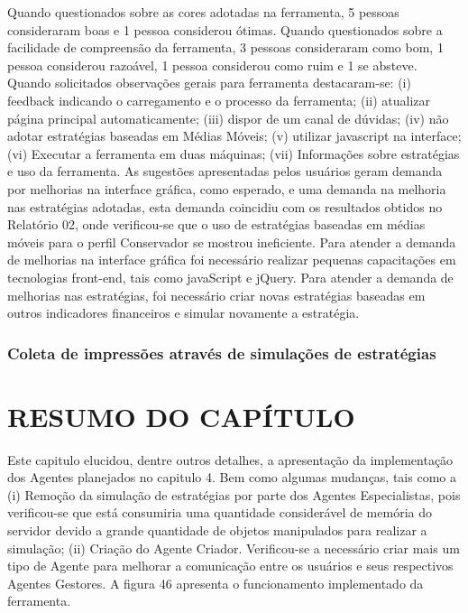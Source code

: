 
Quando questionados sobre as cores adotadas na ferramenta, 5 pessoas consideraram boas e 1 pessoa considerou ótimas. Quando questionados sobre a facilidade de compreensão da ferramenta, 3 pessoas consideraram como bom, 1 pessoa considerou razoável, 1 pessoa considerou como ruim e 1 se absteve. Quando solicitados observações gerais para ferramenta destacaram-se: (i) feedback indicando o carregamento e o processo da ferramenta; (ii) atualizar página principal automaticamente; (iii) dispor de um canal de dúvidas; (iv) não adotar estratégias baseadas em Médias Móveis; (v) utilizar javascript na interface; (vi) Executar a ferramenta em duas máquinas; (vii) Informações sobre estratégias e uso da ferramenta.
As sugestões apresentadas pelos usuários geram demanda por melhorias na interface gráfica, como esperado, e uma demanda na melhoria nas estratégias adotadas, esta demanda coincidiu com os resultados obtidos no Relatório 02, onde verificou-se que o uso de estratégias baseadas em médias móveis para o perfil Conservador se mostrou ineficiente. Para atender a demanda de melhorias na interface gráfica foi necessário realizar pequenas capacitações em tecnologias front-end, tais como javaScript e jQuery. Para atender a demanda de melhorias nas estratégias, foi necessário criar novas estratégias baseadas em outros indicadores financeiros e simular novamente a estratégia.

\subsubsection{Coleta de impressões através de simulações de estratégias}

\section{RESUMO DO CAPÍTULO}

Este capitulo elucidou, dentre outros detalhes, a apresentação da implementação dos Agentes planejados no capitulo 4. Bem como algumas mudanças, tais como a (i) Remoção da simulação de estratégias por parte dos Agentes Especialistas, pois verificou-se que está consumiria uma quantidade considerável de memória do servidor devido a grande quantidade de objetos manipulados para realizar a simulação; (ii) Criação do Agente Criador. Verificou-se a necessário criar mais um tipo de Agente para melhorar a comunicação entre os usuários e seus respectivos Agentes Gestores. A figura 46 apresenta o funcionamento implementado da ferramenta.






